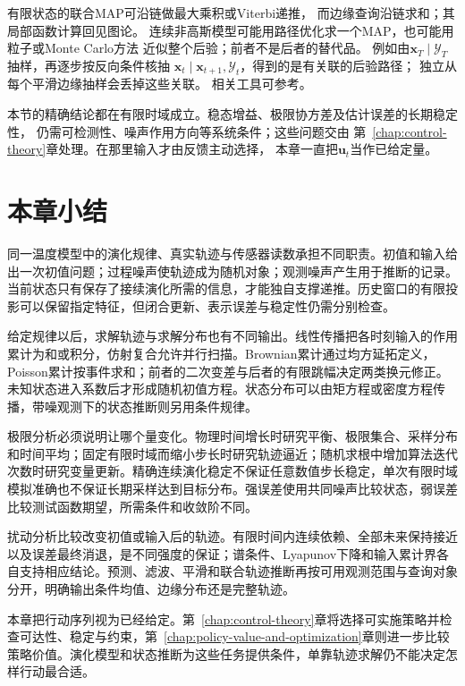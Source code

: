 有限状态的联合MAP可沿链做最大乘积或Viterbi递推，
而边缘查询沿链求和；其局部函数计算回见图论。
连续非高斯模型可能用路径优化求一个MAP，也可能用粒子或Monte Carlo方法
近似整个后验；前者不是后者的替代品。
例如由$\bm x_T\mid\mathcal Y_T$抽样，再逐步按反向条件核抽
$\bm x_t\mid\bm x_{t+1},\mathcal Y_t$，得到的是有关联的后验路径；
独立从每个平滑边缘抽样会丢掉这些关联。
相关工具可参考。

本节的精确结论都在有限时域成立。稳态增益、极限协方差及估计误差的长期稳定性，
仍需可检测性、噪声作用方向等系统条件；这些问题交由
第~\ref{chap:control-theory}章处理。在那里输入才由反馈主动选择，
本章一直把$\bm u_t$当作已给定量。

\section{本章小结}
\label{sec:dynamical-systems-state-estimation-summary}

同一温度模型中的演化规律、真实轨迹与传感器读数承担不同职责。初值和输入给出一次初值问题；过程噪声使轨迹成为随机对象；观测噪声产生用于推断的记录。当前状态只有保存了接续演化所需的信息，才能独自支撑递推。历史窗口的有限投影可以保留指定特征，但闭合更新、表示误差与稳定性仍需分别检查。

给定规律以后，求解轨迹与求解分布也有不同输出。线性传播把各时刻输入的作用累计为和或积分，仿射复合允许并行扫描。Brownian累计通过均方延拓定义，Poisson累计按事件求和；前者的二次变差与后者的有限跳幅决定两类换元修正。未知状态进入系数后才形成随机初值方程。状态分布可以由矩方程或密度方程传播，带噪观测下的状态推断则另用条件规律。

极限分析必须说明让哪个量变化。物理时间增长时研究平衡、极限集合、采样分布和时间平均；固定有限时域而缩小步长时研究轨迹逼近；随机求根中增加算法迭代次数时研究变量更新。精确连续演化稳定不保证任意数值步长稳定，单次有限时域模拟准确也不保证长期采样达到目标分布。强误差使用共同噪声比较状态，弱误差比较测试函数期望，所需条件和收敛阶不同。

扰动分析比较改变初值或输入后的轨迹。有限时间内连续依赖、全部未来保持接近以及误差最终消退，是不同强度的保证；谱条件、Lyapunov下降和输入累计界各自支持相应结论。预测、滤波、平滑和联合轨迹推断再按可用观测范围与查询对象分开，明确输出条件均值、边缘分布还是完整轨迹。

本章把行动序列视为已经给定。第~\ref{chap:control-theory}章将选择可实施策略并检查可达性、稳定与约束，第~\ref{chap:policy-value-and-optimization}章则进一步比较策略价值。演化模型和状态推断为这些任务提供条件，单靠轨迹求解仍不能决定怎样行动最合适。
